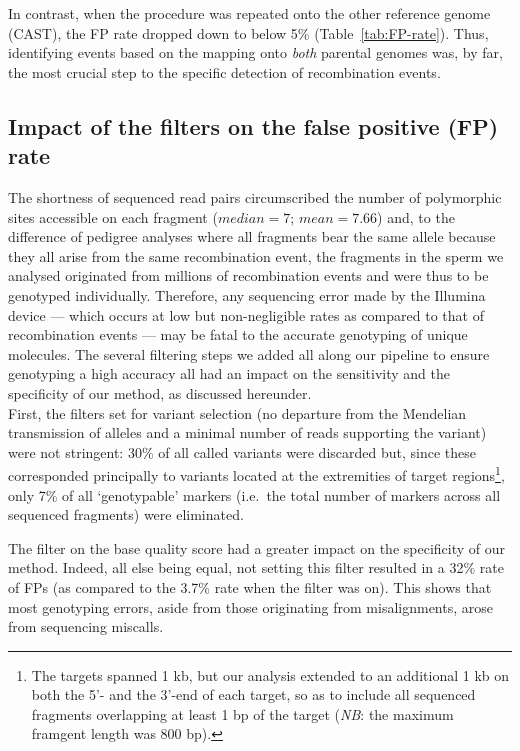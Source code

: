 In contrast, when the procedure was repeated onto the other reference genome (CAST), the FP rate dropped down to below 5\% (Table~\ref{tab:FP-rate}).
Thus, identifying events based on the mapping onto \textit{both} parental genomes was, by far, the most crucial step to the specific detection of recombination events.



\subsection{Impact of the filters on the false positive (FP) rate} 

The shortness of sequenced read pairs circumscribed the number of polymorphic sites accessible on each fragment ($median = 7$; $mean = 7.66$) and, to the difference of pedigree analyses where all fragments bear the same allele because they all arise from the same recombination event, the fragments in the sperm we analysed originated from millions of recombination events and were thus to be genotyped individually.
Therefore, any sequencing error made by the Illumina device — which occurs at low \citep{fox2014accuracy,pfeiffer2018systematic} but non-negligible rates as compared to that of recombination events — may be fatal to the accurate genotyping of unique molecules.
The several filtering steps we added all along our pipeline to ensure genotyping a high accuracy all had an impact on the sensitivity and the specificity of our method, as discussed hereunder.\\


First, the filters set for variant selection (no departure from the Mendelian transmission of alleles and a minimal number of reads supporting the variant) were not stringent: 30\% of all called variants were discarded but, since these corresponded principally to variants located at the extremities of target regions\footnote{The targets spanned 1 kb, but our analysis extended to an additional 1 kb on both the 5’- and the 3’-end of each target, so as to include all sequenced fragments overlapping at least 1 bp of the target (\textit{NB}: the maximum framgent length was 800 bp).}, only 7\% of all ‘genotypable’ markers (i.e.\ the total number of markers across all sequenced fragments) were eliminated.

The filter on the base quality score had a greater impact on the specificity of our method.
Indeed, all else being equal, not setting this filter resulted in a 32\% rate of FPs (as compared to the 3.7\% rate when the filter was on).
This shows that most genotyping errors, aside from those originating from misalignments, arose from sequencing miscalls.


